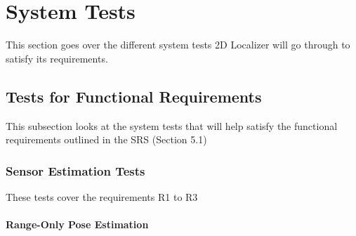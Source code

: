 \documentclass[12pt, titlepage]{article}
\begin{document}



\section{System Tests}\label{sec_sys-tests}

This section goes over the different system tests 2D Localizer will go through to satisfy its requirements.


\subsection{Tests for Functional Requirements}



This subsection looks at the system tests that will help satisfy the functional requirements outlined in the SRS (Section 5.1)

\subsubsection{Sensor Estimation Tests}


  These tests cover the requirements R1 to R3
		
\paragraph{Range-Only Pose Estimation}
\end{document}
